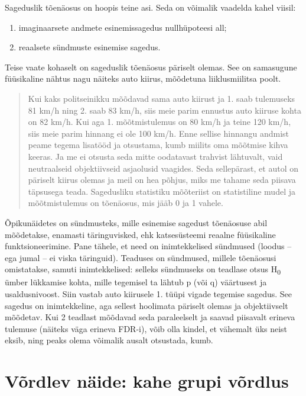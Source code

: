 \documentclass[]{book}
\begin{document}
Sageduslik tõenäosus on hoopis teine asi.
Seda on võimalik vaadelda kahel viisil:

\begin{enumerate}
\def\labelenumi{\arabic{enumi}.}
\item
  imaginaarsete andmete esinemissagedus nullhüpoteesi all;
\item
  reaalsete sündmuste esinemise sagedus.
\end{enumerate}

Teise vaate kohaselt on sageduslik tõenäosus päriselt olemas. See on samasugune füüsikaline nähtus nagu näiteks auto kiirus, mõõdetuna liiklusmiilitsa poolt.

\begin{quote}
Kui kaks politseinikku mõõdavad sama auto kiirust ja 1. saab tulemuseks 81 km/h ning 2. saab 83 km/h, siis meie parim ennustus auto kiiruse kohta on 82 km/h. Kui aga 1. mõõtmistulemus on 80 km/h ja teine 120 km/h, siis meie parim hinnang ei ole 100 km/h. Enne sellise hinnangu andmist peame tegema lisatööd ja otsustama, kumb miilits oma mõõtmise kihva keeras. Ja me ei otsusta seda mitte oodatavast trahvist lähtuvalt, vaid neutraalseid objektiivseid asjaolusid vaagides. Seda sellepärast, et autol on päriselt kiirus olemas ja meil on hea põhjus, miks me tahame seda piisava täpsusega teada. Sagedusliku statistiku mõõteriist on statistiline mudel ja mõõtmistulemus on tõenäosus, mis jääb 0 ja 1 vahele.
\end{quote}

Õpikunäidetes on sündmusteks, mille esinemise sagedust tõenäosuse abil mõõdetakse, enamasti täringuvisked, ehk katsesüsteemi reaalne füüsikaline funktsioneerimine.
Pane tähele, et need on inimtekkelised sündmused (loodus -- ega jumal -- ei viska täringuid).
Teaduses on sündmused, millele tõenäosusi omistatakse, samuti inimtekkelised: selleks sündmuseks on teadlase otsus H\textsubscript{0} ümber lükkamise kohta, mille tegemisel ta lähtub p (või q) väärtusest ja usaldusnivoost.
Siin vastab auto kiirusele 1. tüüpi vigade tegemise sagedus.
See sagedus on inimtekkeline, aga sellest hoolimata päriselt olemas ja objektiivselt mõõdetav.
Kui 2 teadlast mõõdavad seda paraleelselt ja saavad piisavalt erineva tulemuse (näiteks väga erineva FDR-i), võib olla kindel, et vähemalt üks neist eksib, ning peaks olema võimalik ausalt otsustada, kumb.

\hypertarget{vordlev-naide-kahe-grupi-vordlus-1}{%
\section*{Võrdlev näide: kahe grupi võrdlus}\label{vordlev-naide-kahe-grupi-vordlus-1}}
\end{document}
